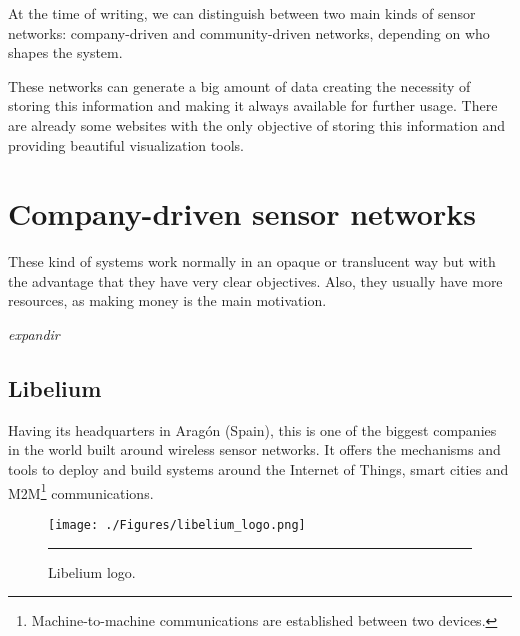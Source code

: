 At the time of writing, we can distinguish between two main kinds of sensor networks: company-driven and community-driven networks, depending on who shapes the system.


These networks can generate a big amount of data creating the necessity of storing this information and making it always available for further usage. There are already some websites with the only objective of storing this information and providing beautiful visualization tools.


\section{Company-driven sensor networks}

These kind of systems work normally in an opaque or translucent way but with the advantage that they have very clear objectives. Also, they usually have more resources, as making money is the main motivation.

\emph{expandir}

\subsection{Libelium}

Having its headquarters in Aragón (Spain), this is one of the biggest companies in the world built around wireless sensor networks. It offers the mechanisms and tools to deploy and build systems around the Internet of Things, smart cities and M2M\footnote{Machine-to-machine communications are established between two devices.} communications.

\begin{figure}[htbp]
    \centering
    \texttt{[image: ./Figures/libelium\_logo.png]}
        \rule{35em}{0.5pt}
        \caption[Libelium logo]{Libelium logo.}
    \label{fig:ArduinoUNO}
\end{figure}

